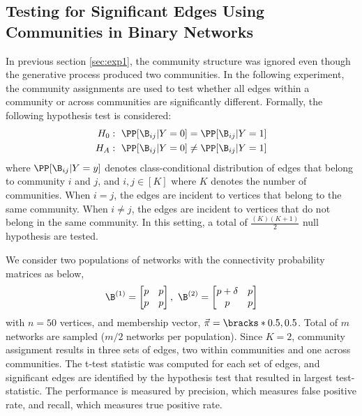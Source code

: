 
\subsection{Testing for Significant Edges Using Communities in Binary Networks} \label{sec:exp3}
In previous section \ref{sec:exp1}, the community structure was ignored even though the generative process produced two communities. In the following experiment, the community assignments are used to test whether all edges within a community or across communities are significantly different. Formally, the following hypothesis test is considered: 
\begin{align*}
    H_0:~ \PP[\B_{ij}|Y=0] = \PP[\B_{ij}|Y=1]\\
    H_A:~  \PP[\B_{ij}|Y=0]\neq \PP[\B_{ij}|Y=1]
\end{align*}
where $\PP[\B_{ij}|Y=y]$ denotes class-conditional distribution of edges that belong to community $i$ and $j$, and $i, j\in [K]$ where $K$ denotes the number of communities. When $i =j$, the edges are incident to vertices that belong to the same community. When $i\neq j$, the edges are incident to vertices that do not belong in the same community. In this setting, a total of $\frac{(K)(K+1)}{2}$ null hypothesis are tested.  

We consider two populations of networks with the connectivity probability matrices as below, 
\begin{align*}
\B^{(1)} = 
    \begin{bmatrix}
    p & p \\ p & p
    \end{bmatrix},~
\B^{(2)} = 
    \begin{bmatrix}
    p+\delta & p \\ p & p
    \end{bmatrix}
\end{align*}
with $n=50$ vertices, and membership vector, $\vec{\pi} = \bracks*{0.5, 0.5}$. Total of $m$ networks are sampled ($m/2$ networks per population). Since $K=2$, community assignment results in three sets of edges, two within communities and one across communities. The t-test statistic was computed for each set of edges, and significant edges are identified by the hypothesis test that resulted in largest test-statistic. The performance is measured by precision, which measures false positive rate, and recall, which measures true positive rate.

